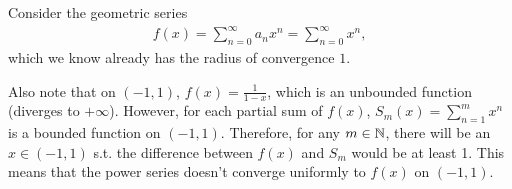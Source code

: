 \documentclass[12pt]{article}
\begin{document}
\begin{fproof}[5(c)]
 Consider the geometric series
 \begin{align*}
    f(x) = \sum_{n=0}^{\infty} a_n x^n = \sum_{n=0}^{\infty} x^n,
 \end{align*}
 which we know already has the radius of convergence \(1\).

 Also note that on \((-1,1)\), \(f(x) = \frac{1}{1-x}\), which is an unbounded function (diverges to \(+\infty\)).
 However, for each partial sum of \(f(x)\), \(S_m(x) = \sum_{n=1}^{m} x^n\) is a bounded function on \((-1,1)\).
 Therefore, for any \(m \in \mathbb {N}\), there will be an \(x \in (-1,1)\) s.t. the difference between \(f(x)\) and \(S_m\) would be at least 1.
 This means that the power series doesn't converge uniformly to \(f(x)\) on \((-1,1)\).

\end{fproof}
\end{document}
